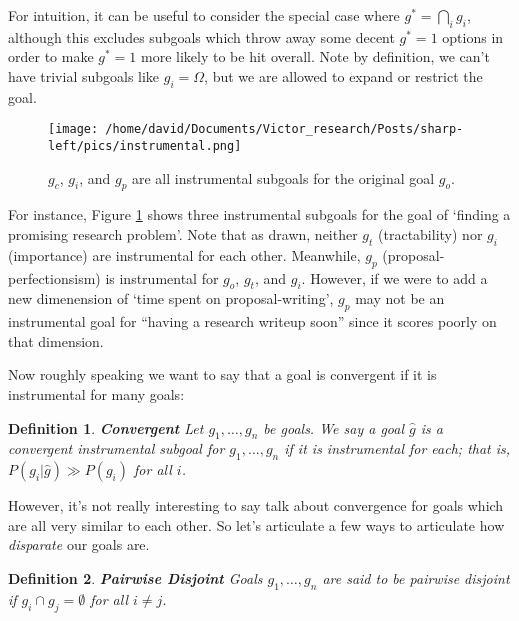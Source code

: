 \documentclass{article}
\newtheorem{definition}{Definition}
\begin{document}
For intuition, it can be useful to consider the special case where $g^* = \bigcap_i g_i$, although this excludes subgoals which throw away some decent $g^*=1$ options in order to make $g^*=1$ more likely to be hit overall. Note by definition, we can't have trivial subgoals like $g_i=\Omega$, but we are allowed to expand or restrict the goal. 

\begin{figure}[ht]
    \centering
    \texttt{[image: /home/david/Documents/Victor\_research/Posts/sharp-left/pics/instrumental.png]} 
    \caption{$g_c$, $g_i$, and $g_p$ are all instrumental subgoals for the original goal $g_o$.}
    \label{fig:instrumental} 
\end{figure}

For instance, Figure \ref{fig:instrumental} shows three instrumental subgoals for the goal of `finding a promising research problem'. Note that as drawn, neither $g_t$ (tractability) nor $g_i$ (importance) are instrumental for each other. Meanwhile, $g_p$ (proposal-perfectionsism) is instrumental for $g_o$, $g_t$, and $g_i$. However, if we were to add a new dimenension of `time spent on proposal-writing', $g_p$ may not be an instrumental goal for ``having a research writeup soon'' since it scores poorly on that dimension.

Now roughly speaking we want to say that a goal is convergent if it is instrumental for many goals:

\begin{definition}{\textbf{Convergent}}
    Let $g_1, \dots, g_n$ be goals. We say a goal $\hat{g}$ is a convergent instrumental subgoal for $g_1, \dots, g_n$ if it is instrumental for each; that is, $P(g_i|\hat{g})\gg P(g_i)$ for all $i$.
\end{definition}

However, it's not really interesting to say talk about convergence for goals which are all very similar to each other. So let's articulate a few ways to articulate how \emph{disparate} our goals are.

\begin{definition}{\textbf{Pairwise Disjoint}}
    Goals $g_1, \dots, g_n$ are said to be \emph{pairwise disjoint} if $g_i\cap g_j=\emptyset$ for all $i \neq j$.
\end{definition}

\end{document}
